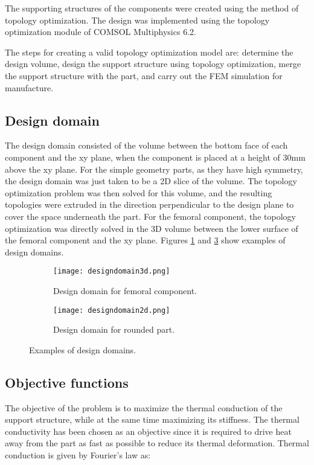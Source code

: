 \documentclass[../main.tex]{subfiles}
\begin{document}
The supporting structures of the components were created using the method of topology optimization. The design was implemented using the topology optimization module of COMSOL Multiphysics 6.2.  

The steps for creating a valid topology optimization model are: determine the design volume, design the support structure using topology optimization, merge the support structure with the part, and carry out the FEM simulation for manufacture.

\subsection{Design domain}

The design domain consisted of the volume between the bottom face of each component and the xy plane, when the component is placed at a height of 30mm above the xy plane. For the simple geometry parts, as they have high symmetry, the design domain was just taken to be a 2D slice of the volume. The topology optimization problem was then solved for this volume, and the resulting topologies were extruded in the direction perpendicular to the design plane to cover the space underneath the part. For the femoral component, the topology optimization was directly solved in the 3D volume between the lower surface of the femoral component and the xy plane. Figures \ref{fig:des1} and \ref{fig:des2} show examples of design domains.


\begin{figure}[h!]
  \begin{subfigure}{0.45\textwidth}
    \texttt{[image: designdomain3d.png]}
    \caption{Design domain for femoral component.}
    \label{fig:des1}
  \end{subfigure}
  \begin{subfigure}{0.45\textwidth}
    \texttt{[image: designdomain2d.png]}
    \caption{Design domain for rounded part.}
    \label{fig:des2}
  \end{subfigure}
  \caption{Examples of design domains.}
\end{figure}

\subsection{Objective functions}

The objective of the problem is to maximize the thermal conduction of the support structure, while at the same time maximizing its stiffness. The thermal conductivity has been chosen as an objective since it is required to drive heat away from the part as fast as possible to reduce its thermal deformation. 
Thermal conduction is given by Fourier's law as:
\end{document}
